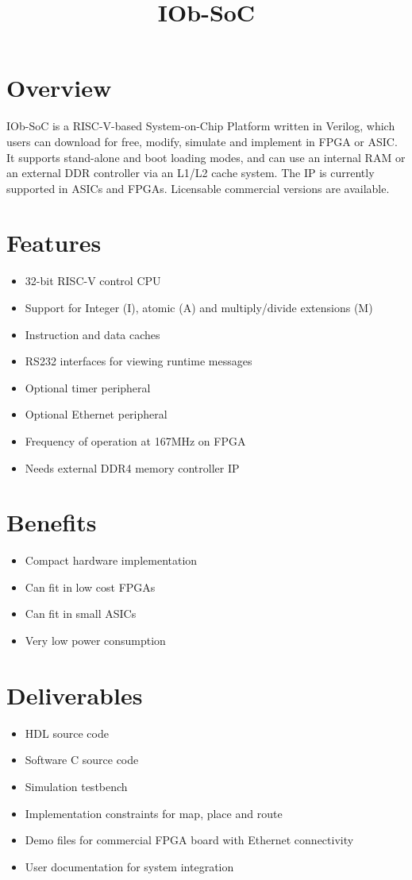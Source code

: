 \documentclass[twocolumn]{iob_pb}
\title{IOb-SoC}
\newcommand\BackgroundPic{%
\put(0,0){%
\parbox[b][\paperheight]{\paperwidth}{%
\vfill
\centering
\texttt{[image: bg.png]}%
\vfill
}}}
\begin{document}
\AddToShipoutPicture*{\BackgroundPic}

\section*{\textcolor[rgb]{0,0,0}{Overview}}

IOb-SoC is a RISC-V-based System-on-Chip Platform written in Verilog, which
users can download for free, modify, simulate and implement in FPGA or ASIC. It
supports stand-alone and boot loading modes, and can use an internal RAM or an
external DDR controller via an L1/L2 cache system. The IP is currently supported
in ASICs and FPGAs. Licensable commercial versions are available.

\section*{\textcolor[rgb]{0,0,0}{Features}}
\begin{itemize}
\item 32-bit RISC-V control CPU
\item Support for Integer (I), atomic (A) and multiply/divide extensions (M)
\item Instruction and data caches
\item RS232 interfaces for viewing runtime messages
\item Optional timer peripheral
\item Optional Ethernet peripheral
\item Frequency of operation at 167MHz on FPGA
\item Needs external DDR4 memory controller IP
\end{itemize}

\section*{\textcolor[rgb]{0,0,0}{Benefits}}
\begin{itemize}
\item Compact hardware implementation
\item Can fit in low cost FPGAs
\item Can fit in small ASICs 
\item Very low power consumption
\end{itemize}


\section*{\textcolor[rgb]{0,0,0}{Deliverables}}
\begin{itemize}
\item HDL source code
\item Software C source code
\item Simulation testbench
\item Implementation constraints for map, place and route
\item Demo files for commercial FPGA board with Ethernet connectivity
\item User documentation for system integration
\end{itemize}
\newpage
\end{document}
